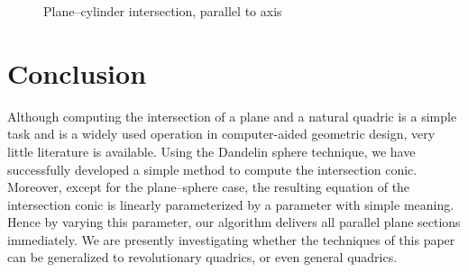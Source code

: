 \begin{figure}
\vspace{4.5cm}
\caption{Plane--cylinder intersection, parallel to axis}
\label{fig:cylinder-line}
\end{figure}


\section{Conclusion}
\label{section:conclusion}

     Although computing the intersection of a plane and a natural quadric is
a simple task and is a widely used operation in computer-aided geometric
design, very little literature is
available.  Using the Dandelin sphere technique, we have successfully
developed a simple method to compute the intersection conic.
Moreover, except for the plane--sphere case,
the resulting equation of the intersection conic is linearly parameterized
by a parameter with simple meaning.  Hence by varying this parameter, our
algorithm delivers all parallel plane sections immediately.
We are presently investigating whether the techniques of this paper 
can be generalized to revolutionary quadrics, or even general quadrics.



